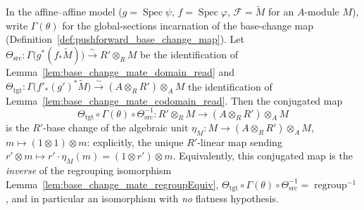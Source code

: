 \begin{lemma}
  In the affine--affine model (\(g = \operatorname{Spec}\psi\),
  \(f = \operatorname{Spec}\varphi\), \(\mathcal{F} = \widetilde M\) for an \(A\)-module
  \(M\)), write \(\Gamma(\theta)\) for the global-sections incarnation of the base-change
  map (Definition~\ref{def:pushforward_base_change_map}). Let
  \(\Theta_{\mathrm{src}} : \Gamma\bigl(g^*(f_*\widetilde M)\bigr) \xrightarrow{\sim}
  R' \otimes_R M\) be the identification of Lemma~\ref{lem:base_change_mate_domain_read}
  and \(\Theta_{\mathrm{tgt}} : \Gamma\bigl(f'_*(g')^*\widetilde M\bigr) \xrightarrow{\sim}
  (A \otimes_R R') \otimes_A M\) the identification of
  Lemma~\ref{lem:base_change_mate_codomain_read}. Then the conjugated map
  \[
    \Theta_{\mathrm{tgt}} \circ \Gamma(\theta) \circ \Theta_{\mathrm{src}}^{-1} :
    R' \otimes_R M \longrightarrow (A \otimes_R R') \otimes_A M
  \]
  is the \(R'\)-base change of the algebraic unit \(\eta_M : M \to (A \otimes_R R') \otimes_A M\),
  \(m \mapsto (1 \otimes 1) \otimes m\): explicitly, the unique \(R'\)-linear map sending
  \(r' \otimes m \mapsto r' \cdot \eta_M(m) = (1 \otimes r') \otimes m\). Equivalently,
  this conjugated map is the \emph{inverse} of the regrouping isomorphism
  Lemma~\ref{lem:base_change_mate_regroupEquiv},
  \(\Theta_{\mathrm{tgt}} \circ \Gamma(\theta) \circ \Theta_{\mathrm{src}}^{-1}
  = \operatorname{regroup}^{-1}\), and in particular an isomorphism with \emph{no}
  flatness hypothesis.
\end{lemma}

